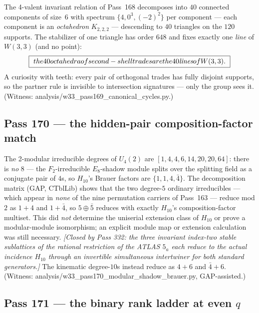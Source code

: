 \documentclass[12pt,a4paper]{article}
\def\mathbb#1{#1}%
\def\mathrm#1{#1}%
\def\texttt#1{#1}%
\def\text#1{#1}%
\theoremstyle{definition}
\begin{document}
The 4-valent invariant relation of Pass~168 decomposes into $40$ connected
components of size~$6$ with spectrum $\{4,0^3,(-2)^2\}$ per component ---
each component is an \emph{octahedron} $K_{2,2,2}$ --- descending to $40$
triangles on the $120$ supports. The stabilizer of one triangle has order
$648$ and fixes exactly one \emph{line} of $W(3,3)$ (and no point):
\[
  \boxed{\ \text{the 40 octahedra of second-shell trades are the 40
  \emph{lines} of } W(3,3).\ }
\]
A curiosity with teeth: every pair of orthogonal trades has fully disjoint
supports, so the partner rule is invisible to intersection signatures ---
only the group sees it. (Witness:
\texttt{analysis/w33\_pass169\_canonical\_cycles.py}.)

\subsection{Pass 170 --- the hidden-pair composition-factor match}
\label{ssec:pass170}

The 2-modular irreducible degrees of $\mathrm{U}_4(2)$ are
$[1,4,4,6,14,20,20,64]$: there is \emph{no} $8$ --- the $\mathbb
F_2$-irreducible $E_8$-shadow module splits over the splitting field as a
conjugate pair of $4$s, so $H_{10}$'s Brauer factors are
$\{1,1,4,\bar4\}$. The decomposition matrix (GAP, CTblLib) shows that the
two degree-$5$ ordinary irreducibles --- which appear
in \emph{none} of the nine permutation carriers of Pass~163 --- reduce mod
$2$ as $1+4$ and $1+\bar4$, so $5\oplus\bar 5$ reduces with exactly
$H_{10}$'s composition-factor multiset.  This did \emph{not} determine
the uniserial extension class of $H_{10}$ or prove a modular-module
isomorphism; an explicit module map or extension calculation was still
necessary.  \emph{[Closed by Pass 332: the three invariant index-two stable
sublattices of the rational restriction of the ATLAS $5_a$ each reduce to the
actual incidence $H_{10}$ through an invertible simultaneous intertwiner for
both standard generators.]}  The kinematic degree-$10$s instead reduce as $4+6$ and
$\bar4+6$.
(Witness: \texttt{analysis/w33\_pass170\_modular\_shadow\_brauer.py},
GAP-assisted.)

\subsection{Pass 171 --- the binary rank ladder at even $q$}
\label{ssec:pass171}
\end{document}
